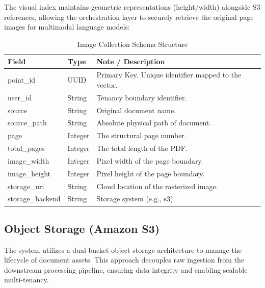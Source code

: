 The visual index maintains geometric representations (height/width) alongside S3 references, allowing the orchestration layer to securely retrieve the original page images for multimodal language models:
\begin{table}[H]
    \centering
    \begin{tabular}{llp{8cm}}
        \toprule
        \textbf{Field} & \textbf{Type} & \textbf{Note / Description} \\
        \midrule
        point\_id & UUID & Primary Key. Unique identifier mapped to the vector. \\
        \midrule
        user\_id & String & Tenancy boundary identifier. \\
        source & String & Original document name. \\
        source\_path & String & Absolute physical path of document. \\
        page & Integer & The structural page number. \\
        total\_pages & Integer & The total length of the PDF. \\
        image\_width & Integer & Pixel width of the page boundary. \\
        image\_height & Integer & Pixel height of the page boundary. \\
        storage\_uri & String & Cloud location of the rasterized image. \\
        storage\_backend & String & Storage system (e.g., s3). \\
        \bottomrule
    \end{tabular}
    \caption{Image Collection Schema Structure}
    \label{tab:qdrant_image_schema}
\end{table}

\subsection{Object Storage (Amazon S3)}
The system utilizes a dual-bucket object storage architecture to manage the lifecycle of document assets. This approach decouples raw ingestion from the downstream processing pipeline, ensuring data integrity and enabling scalable multi-tenancy.

